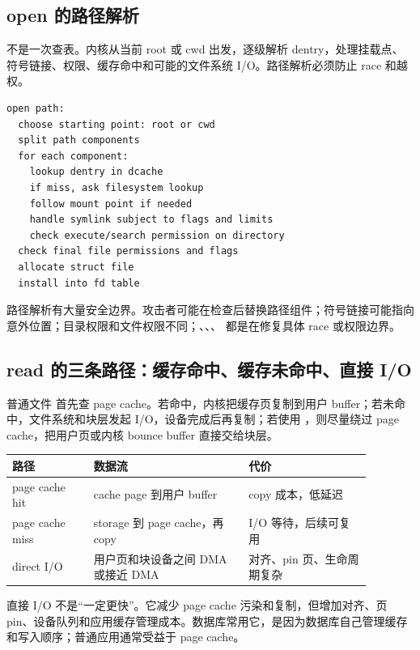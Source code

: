 \subsection{open 的路径解析}

 不是一次查表。内核从当前 root 或 cwd 出发，逐级解析 dentry，处理挂载点、符号链接、权限、缓存命中和可能的文件系统 I/O。路径解析必须防止 race 和越权。

\begin{lstlisting}
open path:
  choose starting point: root or cwd
  split path components
  for each component:
    lookup dentry in dcache
    if miss, ask filesystem lookup
    follow mount point if needed
    handle symlink subject to flags and limits
    check execute/search permission on directory
  check final file permissions and flags
  allocate struct file
  install into fd table
\end{lstlisting}

路径解析有大量安全边界。攻击者可能在检查后替换路径组件；符号链接可能指向意外位置；目录权限和文件权限不同；、、、 都是在修复具体 race 或权限边界。

\subsection{read 的三条路径：缓存命中、缓存未命中、直接 I/O}

普通文件  首先查 page cache。若命中，内核把缓存页复制到用户 buffer；若未命中，文件系统和块层发起 I/O，设备完成后再复制；若使用 ，则尽量绕过 page cache，把用户页或内核 bounce buffer 直接交给块层。

\begin{longtable}{p{0.2\linewidth}p{0.38\linewidth}p{0.3\linewidth}}
\toprule
路径 & 数据流 & 代价 \\
\midrule
page cache hit & cache page 到用户 buffer & copy 成本，低延迟 \\
page cache miss & storage 到 page cache，再 copy & I/O 等待，后续可复用 \\
direct I/O & 用户页和块设备之间 DMA 或接近 DMA & 对齐、pin 页、生命周期复杂 \\
\bottomrule
\end{longtable}

直接 I/O 不是“一定更快”。它减少 page cache 污染和复制，但增加对齐、页 pin、设备队列和应用缓存管理成本。数据库常用它，是因为数据库自己管理缓存和写入顺序；普通应用通常受益于 page cache。

